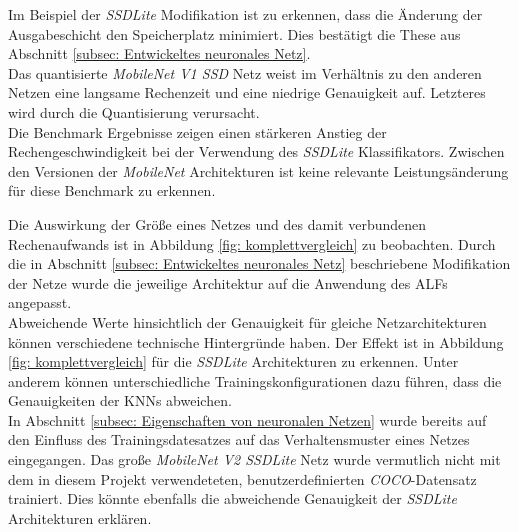 Im Beispiel der \textit{SSDLite} Modifikation ist zu erkennen, dass die Änderung der Ausgabeschicht den Speicherplatz minimiert. Dies bestätigt die These aus Abschnitt \ref{subsec: Entwickeltes neuronales Netz}.\\

Das quantisierte \textit{MobileNet V1 SSD} Netz weist im Verhältnis zu den anderen Netzen eine langsame Rechenzeit und eine niedrige Genauigkeit auf. Letzteres wird durch die Quantisierung verursacht.\\

 Die Benchmark Ergebnisse zeigen einen stärkeren Anstieg der Rechengeschwindigkeit bei der Verwendung des \textit{SSDLite} Klassifikators. Zwischen den Versionen der \textit{MobileNet} Architekturen ist keine relevante Leistungsänderung für diese Benchmark zu erkennen. 



Die Auswirkung der Größe eines Netzes und des damit verbundenen Rechenaufwands ist in Abbildung \ref{fig: komplettvergleich} zu beobachten. Durch die in Abschnitt \ref{subsec: Entwickeltes neuronales Netz} beschriebene Modifikation der Netze wurde die jeweilige Architektur auf die Anwendung des ALFs angepasst.\\

Abweichende Werte hinsichtlich der Genauigkeit für gleiche Netzarchitekturen können verschiedene technische Hintergründe haben. Der Effekt ist in Abbildung \ref{fig: komplettvergleich} für die \textit{SSDLite} Architekturen zu erkennen. Unter anderem können unterschiedliche Trainingskonfigurationen dazu führen, dass die Genauigkeiten der KNNs abweichen.\\

In Abschnitt \ref{subsec: Eigenschaften von neuronalen Netzen} wurde bereits auf den Einfluss des Trainingsdatesatzes auf das Verhaltensmuster eines Netzes eingegangen. Das große \textit{MobileNet V2 SSDLite} Netz wurde vermutlich nicht mit dem in diesem Projekt verwendeteten, benutzerdefinierten \textit{COCO}-Datensatz trainiert. Dies könnte ebenfalls die abweichende Genauigkeit der \textit{SSDLite} Architekturen erklären.


